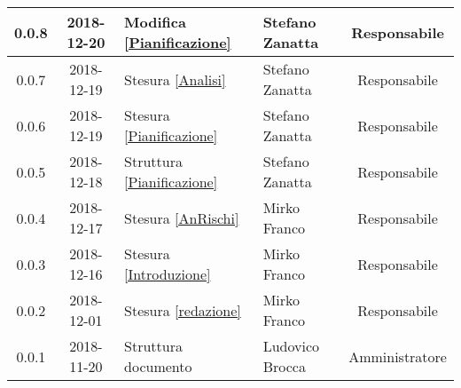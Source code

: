 \begin{center}
\begin{tabularx}{\textwidth}{|c|c|X|X|c|}
			\hline
			0.0.8 & 2018-12-20 & Modifica \ref{Pianificazione} & Stefano Zanatta & Responsabile\\
			\hline
			0.0.7 & 2018-12-19 & Stesura \ref{Analisi}& Stefano Zanatta & Responsabile\\
			\hline
			0.0.6 & 2018-12-19 & Stesura \ref{Pianificazione} & Stefano Zanatta & Responsabile\\
			\hline
			0.0.5 & 2018-12-18 & Struttura \ref{Pianificazione} & Stefano Zanatta & Responsabile\\
			\hline
			0.0.4 & 2018-12-17 & Stesura \ref{AnRischi} & Mirko Franco & Responsabile\\
			\hline
			0.0.3 & 2018-12-16 & Stesura \ref{Introduzione} & Mirko Franco& Responsabile\\
			\hline
			0.0.2 & 2018-12-01 & Stesura \ref{redazione} & Mirko Franco& Responsabile\\
			\hline
			0.0.1 & 2018-11-20 & Struttura documento & Ludovico Brocca & Amministratore\\			
			\hline
			
		\end{tabularx}
	\end{center}
\newpage
